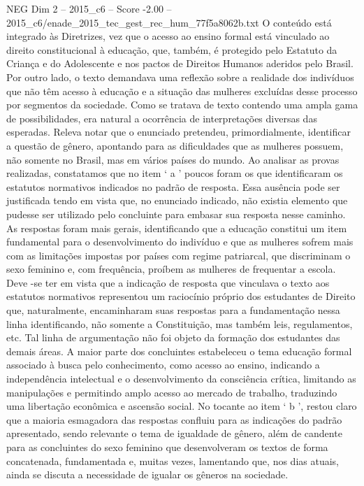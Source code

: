 \begin{textsample}{NEG Dim 2 – 2015\_c6 – Score -2.00 – 2015\_c6/enade\_2015\_tec\_gest\_rec\_hum\_77f5a8062b.txt}
O conteúdo está integrado às Diretrizes, vez que o acesso ao ensino formal está vinculado ao direito constitucional à educação, que, também, é protegido pelo Estatuto da Criança e do Adolescente e nos pactos de Direitos Humanos aderidos pelo Brasil.
Por outro lado, o texto demandava uma reflexão sobre a realidade dos indivíduos que não têm acesso à educação e a situação das mulheres excluídas desse processo por segmentos da sociedade.
Como se tratava de texto contendo uma ampla gama de possibilidades, era natural a ocorrência de interpretações diversas das esperadas.
Releva notar que o enunciado pretendeu, primordialmente, identificar a questão de gênero, apontando para as dificuldades que as mulheres possuem, não somente no Brasil, mas em vários países do mundo.
Ao analisar as provas realizadas, constatamos que no item ‘ a ’ poucos foram os que identificaram os estatutos normativos indicados no padrão de resposta.
Essa ausência pode ser justificada tendo em vista que, no enunciado indicado, não existia elemento que pudesse ser utilizado pelo concluinte para embasar sua resposta nesse caminho.
As respostas foram mais gerais, identificando que a educação constitui um item fundamental para o desenvolvimento do indivíduo e que as mulheres sofrem mais com as limitações impostas por países com regime patriarcal, que discriminam o sexo feminino e, com frequência, proíbem as mulheres de frequentar a escola.
Deve -se ter em vista que a indicação de resposta que vinculava o texto aos estatutos normativos representou um raciocínio próprio dos estudantes de Direito que, naturalmente, encaminharam suas respostas para a fundamentação nessa linha identificando, não somente a Constituição, mas também leis, regulamentos, etc.
Tal linha de argumentação não foi objeto da formação dos estudantes das demais áreas.
A maior parte dos concluintes estabeleceu o tema educação formal associado à busca pelo conhecimento, como acesso ao ensino, indicando a independência intelectual e o desenvolvimento da consciência crítica, limitando as manipulações e permitindo amplo acesso ao mercado de trabalho, traduzindo uma libertação econômica e ascensão social.
No tocante ao item ‘ b ’, restou claro que a maioria esmagadora das respostas confluiu para as indicações do padrão apresentado, sendo relevante o tema de igualdade de gênero, além de candente para as concluintes do sexo feminino que desenvolveram os textos de forma concatenada, fundamentada e, muitas vezes, lamentando que, nos dias atuais, ainda se discuta a necessidade de igualar os gêneros na sociedade.

\end{textsample}
